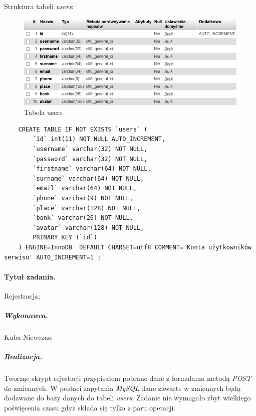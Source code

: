 \documentclass[a4paper]{article}
\begin{document}
	Struktura tabeli \emph{users}:
	
	\begin{figure}[h]
		\centering
		\includegraphics[width=12cm]{images/users.jpg}
		\caption{Tabela users}
	\end{figure}
	
	\begin{verbatim}
	CREATE TABLE IF NOT EXISTS `users` (
		`id` int(11) NOT NULL AUTO_INCREMENT,
		`username` varchar(32) NOT NULL,
		`password` varchar(32) NOT NULL,
		`firstname` varchar(64) NOT NULL,
		`surname` varchar(64) NOT NULL,
		`email` varchar(64) NOT NULL,
		`phone` varchar(9) NOT NULL,
		`place` varchar(128) NOT NULL,
		`bank` varchar(26) NOT NULL,
		`avatar` varchar(128) NOT NULL,
		PRIMARY KEY (`id`)
	) ENGINE=InnoDB  DEFAULT CHARSET=utf8 COMMENT='Konta użytkowników serwisu' AUTO_INCREMENT=1 ;
	\end{verbatim}
	
	\paragraph{Tytuł zadania.} Rejestracja;
	\subparagraph{Wykonawca.} Kuba Niewczas;
	\subparagraph{Realizacja.} Tworząc skrypt rejestacji przypisałem pobrane dane z formularza metodą \emph{POST} do zmiennych. W postaci zapytania \emph{MySQL} dane zawarte w zmiennych będą dodawane do bazy danych do tabeli \emph{users}. Zadanie nie wymagało zbyt wielkiego poświęcenia czasu gdyż składa się tylko z paru operacji.
	
\end{document}
